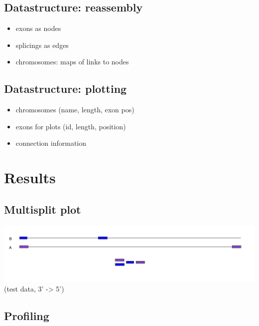 \documentclass[presentation]{beamer}
\begin{document}
\subsection*{Datastructure: reassembly}
\label{sec-2-2}

\begin{itemize}
\item exons as nodes
\item splicings as edges
\item chromosomes: maps of links to nodes
\end{itemize}

\subsection*{Datastructure: plotting}
\label{sec-2-3}

\begin{itemize}
\item chromosomes (name, length, exon pos)
\item exons for plots (id, length, position)
\item connection information
\end{itemize}

\section*{Results}
\label{sec-3}

\subsection*{Multisplit plot}
\label{sec-3-1}

\includegraphics[width=.9\linewidth]{./cb2/snapshot1.png}
(test data, 3' -> 5')

\subsection*{Profiling}
\label{sec-3-2}
\end{document}
